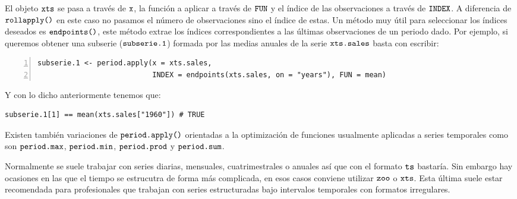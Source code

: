 El objeto $\verb!xts!$ se pasa a través de $\verb!x!$, la función a aplicar a través de $\verb!FUN!$ y el índice de las observaciones a través de $\verb!INDEX!$. A diferencia de $\verb!rollapply()!$ en este caso no pasamos el número de observaciones sino el índice de estas. Un método muy útil para seleccionar los índices deseados es $\verb!endpoints()!$, este método extrae los índices correspondientes a las últimas observaciones de un periodo dado. Por ejemplo, si queremos obtener una subserie ($\verb!subserie.1!$) formada por las medias anuales de la serie $\verb!xts.sales!$ basta con escribir:
\begin{Verbatim}[fontsize=\footnotesize, numbers = left]
subserie.1 <- period.apply(x = xts.sales,
                           INDEX = endpoints(xts.sales, on = "years"), FUN = mean)
\end{Verbatim}

Y con lo dicho anteriormente tenemos que:
\begin{Verbatim}[fontsize=\footnotesize]
subserie.1[1] == mean(xts.sales["1960"]) # TRUE
\end{Verbatim}

Existen también variaciones de $\verb!period.apply()!$ orientadas a la optimización de funciones usualmente aplicadas a series temporales como son $\verb!period.max!$, $\verb!period.min!$, $\verb!period.prod!$ y $\verb!period.sum!$.

Normalmente se suele trabajar con series diarias, mensuales, cuatrimestrales o anuales así que con el formato $\verb!ts!$ bastaría. Sin embargo hay ocasiones en las que el tiempo se estrucutra de forma más complicada, en esos casos conviene utilizar $\verb!zoo!$ o $\verb!xts!$. Esta última suele estar recomendada para profesionales que trabajan con series estructuradas bajo intervalos temporales con formatos irregulares.




